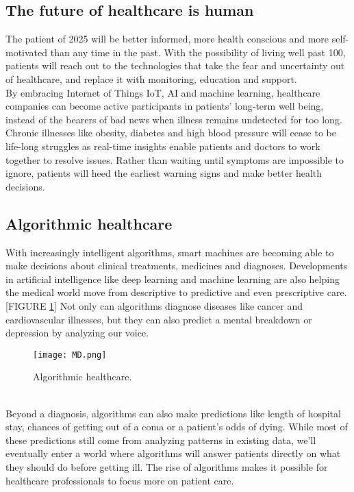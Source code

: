 \documentclass[12pt]{article}
\begin{document}
 \subsection{The future of healthcare is human} The patient of 2025 will be better informed, more health conscious and more self-motivated than any time in the past.
With the possibility of living well past 100, patients will reach out to the technologies that take the fear and uncertainty out of healthcare, and replace it with monitoring, education and support.\\

 \> By embracing Internet of Things IoT, AI and machine learning, healthcare companies can become active participants in patients' long-term well being, instead of the bearers of bad news when illness remains undetected for too long.
Chronic illnesses like obesity, diabetes and high blood pressure will cease to be life-long struggles as real-time insights enable patients and doctors to work together to resolve issues.
Rather than waiting until symptoms are impossible to ignore, patients will heed the earliest warning signs and make better health decisions.
\clearpage
\subsection{Algorithmic healthcare}
With increasingly intelligent algorithms, smart machines are becoming able to make decisions about clinical treatments, medicines and diagnoses.
 Developments in artificial intelligence like deep learning and machine learning are also helping the medical world move from descriptive to predictive and even prescriptive care.[FIGURE \ref{fig_MD}]
Not only can algorithms diagnose diseases like cancer and cardiovascular illnesses, but they can also predict a mental breakdown or depression by analyzing our voice.
\begin{figure}[h]
\centering
\texttt{[image: MD.png]}
\caption{Algorithmic healthcare.}
\label{fig_MD}
\end{figure}\\
Beyond a diagnosis, algorithms can also make predictions like length of hospital stay, chances of getting out of a coma or a patient's odds of dying.
While most of these predictions still come from analyzing patterns in existing data, we'll eventually enter a world where algorithms will answer patients directly on what they should do before getting ill.
The rise of algorithms makes it possible for healthcare professionals to focus more on patient care.
\end{document}
